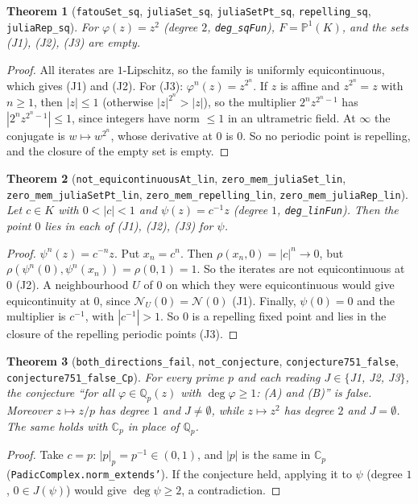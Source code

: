 \documentclass[11pt]{article}
\newtheorem{theorem}{Theorem}
\theoremstyle{definition}
\newcommand{\Qp}{\mathbb{Q}_p}
\newcommand{\Cp}{\mathbb{C}_p}
\newcommand{\PP}{\mathbb{P}^1}
\begin{document}
\begin{theorem}[\texttt{fatouSet\_sq}, \texttt{juliaSet\_sq}, \texttt{juliaSetPt\_sq}, \texttt{repelling\_sq}, \texttt{juliaRep\_sq}]
For $\varphi(z)=z^2$ (degree $2$, \texttt{deg\_sqFun}), $F=\PP(K)$, and the sets (J1), (J2), (J3) are empty.
\end{theorem}
\begin{proof}
All iterates are $1$-Lipschitz, so the family is uniformly equicontinuous, which gives (J1) and (J2).
For (J3): $\varphi^{n}(z)=z^{2^n}$. If $z$ is affine and $z^{2^n}=z$ with $n\ge1$, then $|z|\le1$
(otherwise $|z|^{2^n}>|z|$), so the multiplier $2^n z^{2^n-1}$ has $|2^n z^{2^n-1}|\le1$, since
integers have norm $\le1$ in an ultrametric field. At $\infty$ the conjugate is $w\mapsto w^{2^n}$,
whose derivative at $0$ is $0$. So no periodic point is repelling, and the closure of the empty set
is empty.
\end{proof}

\begin{theorem}[\texttt{not\_equicontinuousAt\_lin}, \texttt{zero\_mem\_juliaSet\_lin}, \texttt{zero\_mem\_juliaSetPt\_lin}, \texttt{zero\_mem\_repelling\_lin}, \texttt{zero\_mem\_juliaRep\_lin}]
Let $c\in K$ with $0<|c|<1$ and $\psi(z)=c^{-1}z$ (degree $1$, \texttt{deg\_linFun}). Then the point
$0$ lies in each of (J1), (J2), (J3) for $\psi$.
\end{theorem}
\begin{proof}
$\psi^{n}(z)=c^{-n}z$. Put $x_n=c^n$. Then $\rho(x_n,0)=|c|^n\to0$, but
$\rho(\psi^{n}(0),\psi^{n}(x_n))=\rho(0,1)=1$. So the iterates are not equicontinuous at $0$ (J2). A
neighbourhood $U$ of $0$ on which they were equicontinuous would give equicontinuity at $0$, since
$\mathcal{N}_U(0)=\mathcal{N}(0)$ (J1). Finally, $\psi(0)=0$ and the multiplier is $c^{-1}$, with
$|c^{-1}|>1$. So $0$ is a repelling fixed point and lies in the closure of the repelling periodic
points (J3).
\end{proof}

\begin{theorem}[\texttt{both\_directions\_fail}, \texttt{not\_conjecture}, \texttt{conjecture751\_false}, \texttt{conjecture751\_false\_Cp}]
For every prime $p$ and each reading $J\in\{$J1, J2, J3$\}$, the conjecture ``for all
$\varphi\in\Qp(z)$ with $\deg\varphi\ge1$: (A) and (B)'' is false. Moreover $z\mapsto z/p$ has degree
$1$ and $J\ne\emptyset$, while $z\mapsto z^2$ has degree $2$ and $J=\emptyset$. The same holds with
$\Cp$ in place of $\Qp$.
\end{theorem}
\begin{proof}
Take $c=p$: $|p|_p=p^{-1}\in(0,1)$, and $|p|$ is the same in $\Cp$ (\texttt{PadicComplex.norm\_extends'}).
If the conjecture held, applying it to $\psi$ (degree $1$, $0\in J(\psi)$) would give
$\deg\psi\ge2$, a contradiction.
\end{proof}
\end{document}
